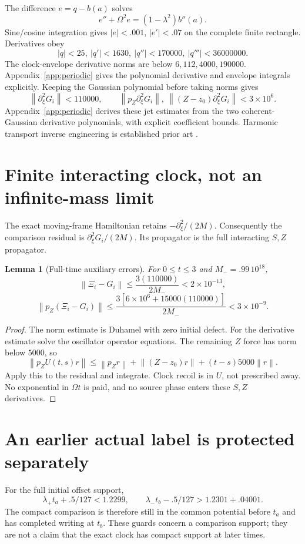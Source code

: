 \documentclass[11pt]{article}
\newtheorem{lemma}[theorem]{Lemma}
\theoremstyle{definition}\newtheorem{definition}[theorem]{Definition}
\theoremstyle{remark}\newtheorem{remark}[theorem]{Remark}
\newcommand{\norm}[1]{\left\lVert#1\right\rVert}
\begin{document}
The difference $e=q-b(a)$ solves
\[
 e''+\Omega^2e=(1-\lambda^2)b''(a).
\]
Sine/cosine integration gives $|e|<.001$, $|e'|<.07$ on the complete finite rectangle. Derivatives obey
\[
 |q|<25,\ |q'|<1630,\ |q''|<170000,\ |q'''|<36000000.
\]
The clock-envelope derivative norms are below $6,112,4000,190000$. Appendix~\ref{app:periodic} gives the polynomial derivative and envelope
integrals explicitly. Keeping the Gaussian polynomial before taking norms gives
\[
 \boxed{\norm{\partial_\xi^2G_i}<110000,\qquad
 \norm{p_Z\partial_\xi^2G_i},\ 
 \norm{(Z-z_0)\partial_\xi^2G_i}<3\times10^6.}
\]
Appendix~\ref{app:periodic} derives these jet estimates from the two
coherent-Gaussian derivative polynomials, with explicit coefficient bounds. Harmonic transport inverse engineering is established prior art \cite{Tor}.

\section{Finite interacting clock, not an infinite-mass limit}
The exact moving-frame Hamiltonian retains $-\partial_\xi^2/(2M)$. Consequently the comparison residual is $\partial_\xi^2G_i/(2M)$. Its propagator is the full interacting $S,Z$ propagator.

\begin{lemma}[Full-time auxiliary errors]\label{pa:lem:aux}
For $0\le t\le3$ and $M_-=.99\,10^{18}$,
\[
 \norm{\Xi_i-G_i}\le\frac{3(110000)}{2M_-}<2\times10^{-13},
\]
\[
 \norm{p_Z(\Xi_i-G_i)}
 \le\frac{3[6\times10^6+15000(110000)]}{2M_-}
 <3\times10^{-9}.
\]
\end{lemma}
\begin{proof}
The norm estimate is Duhamel with zero initial defect. For the derivative estimate solve the oscillator operator equations. The remaining $Z$ force has norm below $5000$, so
\[
 \norm{p_ZU(t,s)r}\le\norm{p_Zr}+\norm{(Z-z_0)r}
 +(t-s)5000\norm r.
\]
Apply this to the residual and integrate. Clock recoil is in $U$, not prescribed away. No exponential in $\Omega t$ is paid, and no source phase enters these $S,Z$ derivatives.
\end{proof}

\section{An earlier actual label is protected separately}
For the full initial offset support,
\[
 \lambda_+t_a+.5/127<1.2299,
 \qquad
 \lambda_-t_b-.5/127>1.2301+.04001.
\]
The compact comparison is therefore still in the common potential before $t_a$ and has completed writing at $t_b$. These guards concern a comparison support; they are not a claim that the exact clock has compact support at later times.
\end{document}
